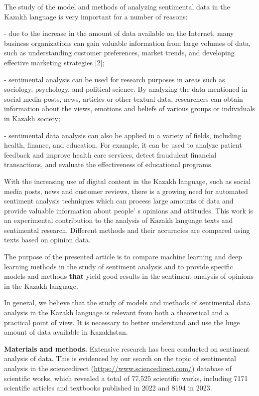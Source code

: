 The study of the model and methods of analyzing sentimental data in the
Kazakh language is very important for a number of reasons:

- due to the increase in the amount of data available on the Internet,
many business organizations can gain valuable information from large
volumes of data, such as understanding customer preferences, market
trends, and developing effective marketing strategies {[}2{]};

- sentimental analysis can be used for research purposes in areas such
as sociology, psychology, and political science. By analyzing the data
mentioned in social media posts, news, articles or other textual data,
researchers can obtain information about the views, emotions and beliefs
of various groups or individuals in Kazakh society;

- sentimental data analysis can also be applied in a variety of fields,
including health, finance, and education. For example, it can be used to
analyze patient feedback and improve health care services, detect
fraudulent financial transactions, and evaluate the effectiveness of
educational programs.

With the increasing use of digital content in the Kazakh language, such
as social media posts, news and customer reviews, there is a growing
need for automated sentiment analysis techniques which can process large
amounts of data and provide valuable information about
people' s opinions and attitudes. This work is an
experimental contribution to the analysis of Kazakh language texts and
sentimental research. Different methods and their accuracies are
compared using texts based on opinion data.

The purpose of the presented article is to compare machine learning and
deep learning methods in the study of sentiment analysis and to provide
specific models and methods {\bfseries that} yield good results in the
sentiment analysis of opinions in the Kazakh language.

In general, we believe that the study of models and methods of
sentimental data analysis in the Kazakh language is relevant from both a
theoretical and a practical point of view. It is necessary to better
understand and use the huge amount of data available in Kazakhstan.

{\bfseries Materials and methods.} Extensive research has been conducted on
sentiment analysis of data. This is evidenced by our search on the topic
of sentimental analysis in the sciencedirect
(\url{https://www.sciencedirect.com/}) database of scientific works,
which revealed a total of 77,525 scientific works, including 7171
scientific articles and textbooks published in 2022 and 8194 in 2023.


